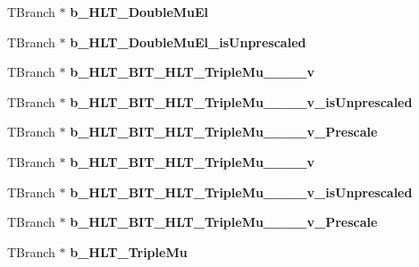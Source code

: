 \begin{DoxyCompactItemize}
\item 
\hypertarget{classMiniTree_a30501a9a437823771175a931e3513cfc}{}\label{classMiniTree_a30501a9a437823771175a931e3513cfc} 
T\+Branch $\ast$ {\bfseries b\+\_\+\+H\+L\+T\+\_\+\+Double\+Mu\+El}
\item 
\hypertarget{classMiniTree_aec360c039929699a91831edf7d32bbdc}{}\label{classMiniTree_aec360c039929699a91831edf7d32bbdc} 
T\+Branch $\ast$ {\bfseries b\+\_\+\+H\+L\+T\+\_\+\+Double\+Mu\+El\+\_\+is\+Unprescaled}
\item 
\hypertarget{classMiniTree_a30212ffd28c376ac874046720f0fa97a}{}\label{classMiniTree_a30212ffd28c376ac874046720f0fa97a} 
T\+Branch $\ast$ {\bfseries b\+\_\+\+H\+L\+T\+\_\+\+B\+I\+T\+\_\+\+H\+L\+T\+\_\+\+Triple\+Mu\+\_\+\_\+\_\+\_\+v}
\item 
\hypertarget{classMiniTree_a1d303039b1e85779490375623b7105ce}{}\label{classMiniTree_a1d303039b1e85779490375623b7105ce} 
T\+Branch $\ast$ {\bfseries b\+\_\+\+H\+L\+T\+\_\+\+B\+I\+T\+\_\+\+H\+L\+T\+\_\+\+Triple\+Mu\+\_\+\_\+\_\+\_\+v\+\_\+is\+Unprescaled}
\item 
\hypertarget{classMiniTree_abb31dc5f2bf48fe2b217b715db65e57b}{}\label{classMiniTree_abb31dc5f2bf48fe2b217b715db65e57b} 
T\+Branch $\ast$ {\bfseries b\+\_\+\+H\+L\+T\+\_\+\+B\+I\+T\+\_\+\+H\+L\+T\+\_\+\+Triple\+Mu\+\_\+\_\+\_\+\_\+v\+\_\+\+Prescale}
\item 
\hypertarget{classMiniTree_afcfb72a29e65c1d101da8b01e87787c6}{}\label{classMiniTree_afcfb72a29e65c1d101da8b01e87787c6} 
T\+Branch $\ast$ {\bfseries b\+\_\+\+H\+L\+T\+\_\+\+B\+I\+T\+\_\+\+H\+L\+T\+\_\+\+Triple\+Mu\+\_\+\_\+\_\+\_\+v}
\item 
\hypertarget{classMiniTree_a20778c09eaa37c183934a12d9c38c82f}{}\label{classMiniTree_a20778c09eaa37c183934a12d9c38c82f} 
T\+Branch $\ast$ {\bfseries b\+\_\+\+H\+L\+T\+\_\+\+B\+I\+T\+\_\+\+H\+L\+T\+\_\+\+Triple\+Mu\+\_\+\_\+\_\+\_\+v\+\_\+is\+Unprescaled}
\item 
\hypertarget{classMiniTree_a0ef75ee1a0fdfc87c9d16acb686ae892}{}\label{classMiniTree_a0ef75ee1a0fdfc87c9d16acb686ae892} 
T\+Branch $\ast$ {\bfseries b\+\_\+\+H\+L\+T\+\_\+\+B\+I\+T\+\_\+\+H\+L\+T\+\_\+\+Triple\+Mu\+\_\+\_\+\_\+\_\+v\+\_\+\+Prescale}
\item 
\hypertarget{classMiniTree_a09a18429438cd50c147f482367164212}{}\label{classMiniTree_a09a18429438cd50c147f482367164212} 
T\+Branch $\ast$ {\bfseries b\+\_\+\+H\+L\+T\+\_\+\+Triple\+Mu}
\item 
\hypertarget{classMiniTree_a539b1c07ef07af0e148fc6585d113328}{}\label{classMiniTree_a539b1c07ef07af0e148fc6585d113328} 

\end{DoxyCompactItemize}

